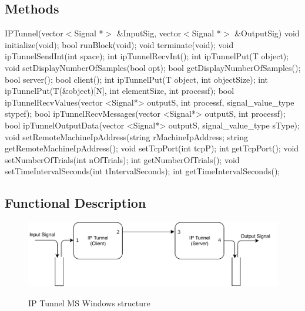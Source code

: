 \subsection*{Methods}
%
IPTunnel(vector$<$Signal *$>$ \&InputSig, vector$<$Signal *$>$ \&OutputSig)
\bigbreak
void initialize(void);
\bigbreak
bool runBlock(void);
\bigbreak
void terminate(void);
\bigbreak
void ipTunnelSendInt(int space);
\bigbreak
int ipTunnelRecvInt();
\bigbreak
int ipTunnelPut(T object);
\bigbreak
void setDisplayNumberOfSamples(bool opt);
\bigbreak
bool getDisplayNumberOfSamples();
\bigbreak
bool server();
\bigbreak
bool client();
\bigbreak
int ipTunnelPut(T object, int objectSize);
\bigbreak
int ipTunnelPut(T(\&object)[N], int elementSize, int processf);
\bigbreak
bool ipTunnelRecvValues(vector <Signal*> outputS, int processf, signal\_value\_type stypef);
\bigbreak
bool ipTunnelRecvMessages(vector <Signal*> outputS, int processf);
\bigbreak
bool ipTunnelOutputData(vector <Signal*> outputS, signal\_value\_type sType);
\bigbreak
void setRemoteMachineIpAddress(string rMachineIpAddress;
\bigbreak
string getRemoteMachineIpAddress();
\bigbreak
void setTcpPort(int tcpP);
\bigbreak
int getTcpPort();
\bigbreak
void setNumberOfTrials(int nOfTrials);
\bigbreak
int getNumberOfTrials();
\bigbreak
void setTimeIntervalSeconds(int tIntervalSeconds);
\bigbreak
int getTimeIntervalSeconds();




\subsection*{Functional Description}

\begin{figure}[hbt!]
	\centering
	\includegraphics[width=1.0\textwidth]{./lib/ip_tunnel_ms_windows/figures/StructureTCPIP4.pdf}
	\label{IP Tunnel Block}\caption{IP Tunnel MS Windows structure}
\end{figure}

